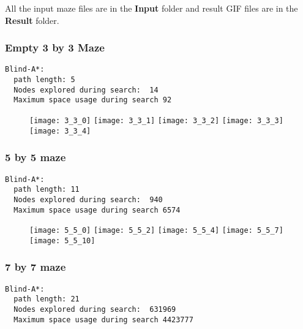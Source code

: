 \documentclass{article}
\begin{document}
All the input maze files are in the \textbf{Input} folder and result GIF files are in the \textbf{Result} folder.

\subsubsection{Empty 3 by 3 Maze}
\begin{lstlisting}
Blind-A*:  
  path length: 5
  Nodes explored during search:  14
  Maximum space usage during search 92

\end{lstlisting}
\begin{figure}[!htb]

  \texttt{[image: 3\_3\_0]}
\endminipage\hfill
{}
  \texttt{[image: 3\_3\_1]}
\endminipage\hfill
{}
  \texttt{[image: 3\_3\_2]}
\endminipage
{}
  \texttt{[image: 3\_3\_3]}
\endminipage
{}
  \texttt{[image: 3\_3\_4]}
\endminipage
\end{figure}

\subsubsection{5 by 5 maze}

\begin{lstlisting}
Blind-A*:  
  path length: 11
  Nodes explored during search:  940
  Maximum space usage during search 6574
\end{lstlisting}

\begin{figure}[!htb]

  \texttt{[image: 5\_5\_0]}
\endminipage\hfill
{}
  \texttt{[image: 5\_5\_2]}
\endminipage\hfill
{}
  \texttt{[image: 5\_5\_4]}
\endminipage
{}
  \texttt{[image: 5\_5\_7]}
\endminipage
{}
  \texttt{[image: 5\_5\_10]}
\endminipage
\end{figure}

\clearpage
\subsubsection{7 by 7 maze}
\begin{lstlisting}
Blind-A*:  
  path length: 21
  Nodes explored during search:  631969
  Maximum space usage during search 4423777
\end{lstlisting}
\end{document}
